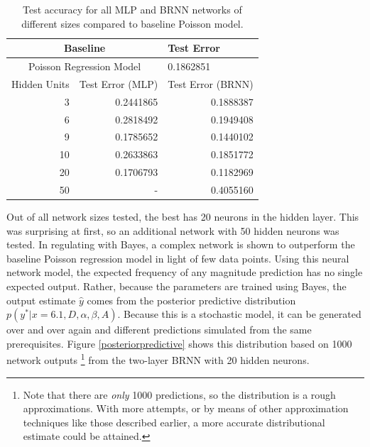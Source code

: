 \begin{table}[ht]
\centering
\begin{tabular}{rrr}
  \hline
\multicolumn{2}{c}{Baseline} & \multicolumn{1}{l}{Test Error} \\ 
  \hline
  \multicolumn{2}{c}{Poisson Regression Model} & \multicolumn{1}{l}{0.1862851} \\ 
  \hline
Hidden Units & Test Error (MLP) & Test Error (BRNN) \\ 
  \hline
3 & 0.2441865  & 0.1888387 \\ 
6 & 0.2818492  & 0.1949408 \\ 
9 & 0.1785652  & 0.1440102 \\ 
10 & 0.2633863  & 0.1851772 \\ 
20 & 0.1706793  & 0.1182969 \\ 
 50 & - & 0.4055160 \\ 
   \hline
\end{tabular}
   \caption{Test accuracy for all MLP and BRNN networks of different sizes compared to baseline Poisson model.}
\end{table}



Out of all network sizes tested, the best has 20 neurons in the hidden layer.  This was surprising at first, so an additional network with 50 hidden neurons was tested.  In regulating with Bayes, a complex network is shown to outperform the baseline Poisson regression model in light of few data points.  Using this neural network model, the expected frequency of any magnitude prediction has no single expected output.  Rather, because the parameters are trained using Bayes, the output estimate $\hat{y}$ comes from the posterior predictive distribution $p(y^*|x=6.1,D,\alpha,\beta,A)$.  Because this is a stochastic model, it can be generated over and over again and different predictions simulated from the same prerequisites.  Figure \ref{posteriorpredictive} shows this distribution based on 1000 network outputs 
\footnote{Note that there are \textit{only} 1000 predictions, so the distribution is a rough approximations.  With more attempts, or by means of other approximation techniques like those described earlier, a more accurate distributional estimate could be attained.}
 from the two-layer BRNN with 20 hidden neurons.


